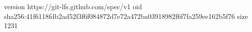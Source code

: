 version https://git-lfs.github.com/spec/v1
oid sha256:41f6118fdb2ad52f3f6f084872d7e72a472ba03918982f6f7fa259ee162b5f76
size 1231
